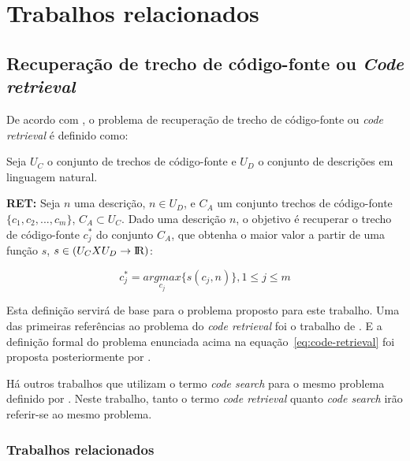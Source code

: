 \chapter{Trabalhos relacionados}
\label{cap:trabalhos-relacionados}



\section{Recuperação de trecho de código-fonte ou \textit{Code retrieval}}
\label{sec:code-retrieval}

De acordo com \cite{iyer-etal-2016-summarizing}, o problema de recuperação de trecho de código-fonte ou \textit{code retrieval} é definido como:

Seja $U_{C}$ o conjunto de trechos de código-fonte e $U_{D}$ o conjunto de descrições em linguagem natural. 

\textbf{RET:} Seja $n$ uma descrição, $n \in U_{D}$, e $C_{A}$ um conjunto trechos de código-fonte $\{c_{1}, c_{2}, ..., c_{m}\}$, $C_{A} \subset U_{C}$. Dado uma descrição $n$, o objetivo é recuperar o trecho de código-fonte $c_{j}^{*}$ do conjunto $C_{A}$, que obtenha o maior valor a partir de uma função $s$, $s \in (U_{C} X U_{D} \rightarrow \rm I\!R)$:

\begin{equation}\label{eq:code-retrieval}
c_{j}^{*} = \underset{c_{j}}{argmax} \{s(c_{j} , n)\}, 1 \leq j \leq m   
\end{equation}


Esta definição servirá de base para o problema proposto para este trabalho. Uma das primeiras referências ao problema do \textit{code retrieval} foi o trabalho de \cite{Allamanis-bimodal-source-code-natural-language:2015}. E a definição formal do problema enunciada acima na equação~\ref{eq:code-retrieval} foi proposta posteriormente por \cite{iyer-etal-2016-summarizing}. 

Há outros trabalhos \citep{Gu-deep-code-search:2018, Sachdev-neural-code-search:2018, cambronero-deep-learning-code-search:2019} que utilizam o termo \textit{code search} para o mesmo problema definido por \cite{iyer-etal-2016-summarizing}. Neste trabalho, tanto o termo \textit{code retrieval} quanto \textit{code search} irão referir-se ao mesmo problema.

\subsection{Trabalhos relacionados}\label{sec:code-retrieval-trabalhos-relacionados}

